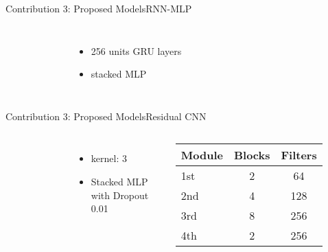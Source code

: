 \begin{frame}{Contribution 3: Proposed Models}{RNN-MLP}
    \begin{columns}
        \begin{figure}
            
        \end{figure}

        \begin{itemize}
            \item 256 units GRU layers
            \item stacked MLP
        \end{itemize}
    \end{columns}
\end{frame}

\begin{frame}{Contribution 3: Proposed Models}{Residual CNN}
    \begin{columns}
        \begin{figure}
            
            
        \end{figure}

        \begin{itemize}
            \item kernel: 3
            \item Stacked MLP with Dropout 0.01
        \end{itemize}
        \begin{tabular}{lSS}
            \hline
            Module & {Blocks} & {Filters} \\
            \hline
            1st    & 2        & 64        \\
            2nd    & 4        & 128       \\
            3rd    & 8        & 256       \\
            4th    & 2        & 256       \\
            \hline
        \end{tabular}
    \end{columns}

\end{frame}

